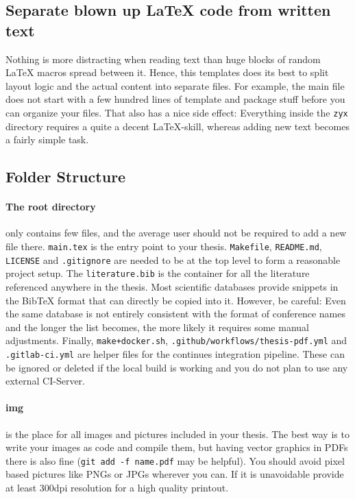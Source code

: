 \documentclass[../main.tex]{subfiles}
\begin{document}
\subsection{Separate blown up LaTeX code from written text}

Nothing is more distracting when reading text than huge blocks of random LaTeX macros spread between it.
Hence, this templates does its best to split layout logic and the actual content into separate files.
For example, the main file does not start with a few hundred lines of template and package stuff before you can organize your files.
That also has a nice side effect: Everything inside the \texttt{zyx} directory requires a quite a decent LaTeX-skill, whereas adding new text becomes a fairly simple task.

\newpage
\subsection{Folder Structure}

\paragraph{The root directory} only contains few files, and the average user should not be required to add a new file there.
\texttt{main.tex} is the entry point to your thesis.
\texttt{Makefile}, \texttt{README.md}, \texttt{LICENSE} and \texttt{.gitignore} are needed to be at the top level to form a reasonable project setup.
The \texttt{literature.bib} is the container for all the literature referenced anywhere in the thesis.
Most scientific databases provide snippets in the BibTeX format that can directly be copied into it.
However, be careful: Even the same database is not entirely consistent with the format of conference names and the longer the list becomes, the more likely it requires some manual adjustments.
Finally, \texttt{make+docker.sh}, \texttt{.github/workflows/thesis-pdf.yml} and \texttt{.gitlab-ci.yml} are helper files for the continues integration pipeline.
These can be ignored or deleted if the local build is working and you do not plan to use any external CI-Server.

\paragraph{img} is the place for all images and pictures included in your thesis.
The best way is to write your images as code and compile them, but having vector graphics in PDFs there is also fine (\texttt{git add -f name.pdf} may be helpful).
You should avoid pixel based pictures like PNGs or JPGs wherever you can.
If it is unavoidable provide at least 300dpi resolution for a high quality printout.
\end{document}
